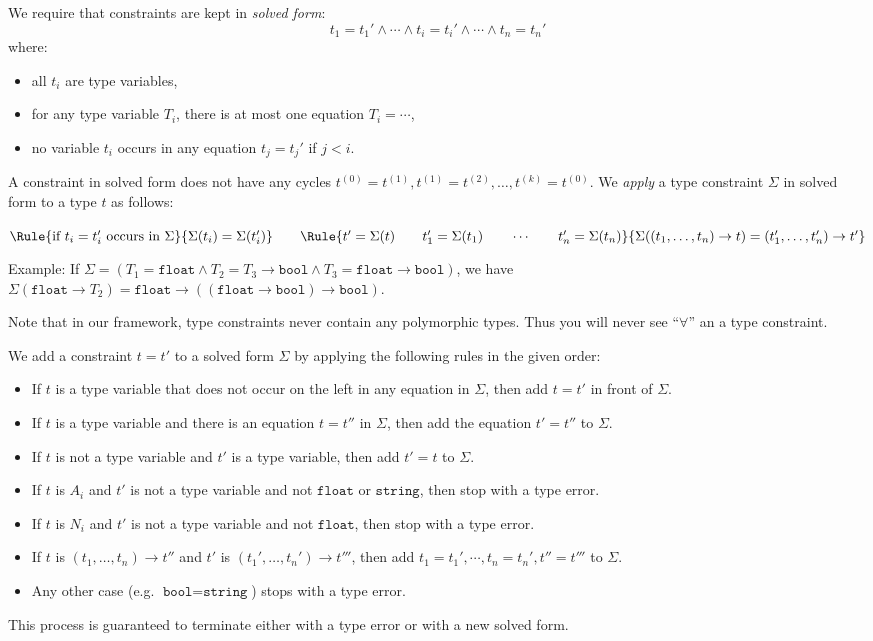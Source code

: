 \noindent
We require that constraints are kept in \emph{solved form}:
\[
t_1 = t_1' \wedge \cdots \wedge t_i = t_i' \wedge \cdots \wedge t_n = t_n'
\]
where:
\begin{itemize}
\item all $t_i$ are type variables,
\item for any type variable $T_i$, there is at most one equation $T_i = \cdots$,
\item no variable $t_i$ occurs in any equation $t_j = t_j'$ if $j < i$.
\end{itemize}
A constraint in solved form does not have any cycles $t^{(0)} = t^{(1)}, t^{(1)} = t^{(2)}, \ldots, t^{(k)} = t^{(0)}$.
We \emph{apply} a type constraint $\Sigma$ in solved form to a type $t$ as follows:

$\Rule{\textrm{if }t_i = t_i'\textrm{ occurs in }\Sigma}{
  \Sigma(t_i) = \Sigma(t_i')}
\qquad
\Rule{t' = \Sigma(t) \qquad t_1' = \Sigma(t_1) \qquad \cdots \qquad t_n' = \Sigma(t_n) }{
  \Sigma((t_1, \ldots, t_n) \rightarrow t) = (t_1', \ldots, t_n') \rightarrow t'}
$

\noindent
Example: If $\Sigma = (T_1 = \texttt{float} \wedge T_2 = T_3 \rightarrow \texttt{bool} \wedge T_3 = \texttt{float}
\rightarrow \texttt{bool})$, we have $\Sigma(\texttt{float} \rightarrow T_2) = \texttt{float} \rightarrow ((\texttt{float}
\rightarrow \texttt{bool}) \rightarrow \texttt{bool})$.

Note that in our framework, type constraints never contain any polymorphic types. Thus
you will never see ``$\forall$'' an a type constraint.

We add a constraint $t = t'$ to a solved form $\Sigma$ by applying the following rules
in the given order:
\begin{itemize}
\item If $t$ is a type variable that does not occur on the left in any equation in $\Sigma$,
  then add $t = t'$ in front of $\Sigma$.
\item If $t$ is a type variable and there is an equation $t = t''$ in $\Sigma$, then
  add the equation $t' = t''$ to $\Sigma$.
\item If $t$ is not a type variable and $t'$ is a type variable, then add $t' = t$ to $\Sigma$.
\item If $t$ is $A_i$ and $t'$ is not a type variable and not $\texttt{float}$ or $\texttt{string}$,
  then stop with a type error.
\item If $t$ is $N_i$ and $t'$ is not a type variable and not $\texttt{float}$,
  then stop with a type error.
\item If $t$ is $(t_1,\ldots, t_n) \rightarrow t''$ and
  $t'$ is $(t_1',\ldots, t_n') \rightarrow t'''$, then add
  $t_1 = t_1', \cdots, t_n = t_n', t'' = t'''$ to $\Sigma$.
\item Any other case  (e.g. $\texttt{bool} = \texttt{string}$) stops with a type error.
\end{itemize}
This process is guaranteed to terminate either with a type error or with a new solved form.

